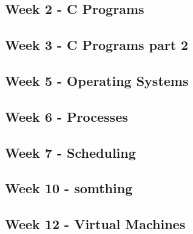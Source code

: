 
\subsection*{Week 2 - C Programs}



\subsection*{Week 3 - C Programs part 2}



\subsection*{Week 5 - Operating Systems}



\subsection*{Week 6 - Processes}



\subsection*{Week 7 - Scheduling}


\subsection*{Week 10 - somthing}


\subsection*{Week 12 - Virtual Machines}

